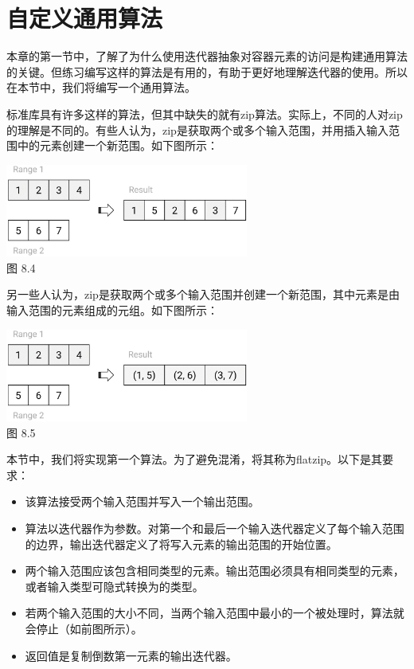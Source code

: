 \section{自定义通用算法}

本章的第一节中，了解了为什么使用迭代器抽象对容器元素的访问是构建通用算法的关键。但练习编写这样的算法是有用的，有助于更好地理解迭代器的使用。所以在本节中，我们将编写一个通用算法。

标准库具有许多这样的算法，但其中缺失的就有zip算法。实际上，不同的人对zip的理解是不同的。有些人认为，zip是获取两个或多个输入范围，并用插入输入范围中的元素创建一个新范围。如下图所示：

\begin{center}
\includegraphics[width=0.6\textwidth]{images/4.png}\\
图 8.4
\end{center}

另一些人认为，zip是获取两个或多个输入范围并创建一个新范围，其中元素是由输入范围的元素组成的元组。如下图所示：

\begin{center}
\includegraphics[width=0.6\textwidth]{images/5.png}\\
图 8.5
\end{center}

本节中，我们将实现第一个算法。为了避免混淆，将其称为flatzip。以下是其要求：

\begin{itemize}
  \item 该算法接受两个输入范围并写入一个输出范围。
  \item 算法以迭代器作为参数。对第一个和最后一个输入迭代器定义了每个输入范围的边界，输出迭代器定义了将写入元素的输出范围的开始位置。
  \item 两个输入范围应该包含相同类型的元素。输出范围必须具有相同类型的元素，或者输入类型可隐式转换为的类型。
  \item 若两个输入范围的大小不同，当两个输入范围中最小的一个被处理时，算法就会停止（如前图所示）。
  \item 返回值是复制倒数第一元素的输出迭代器。
\end{itemize}

